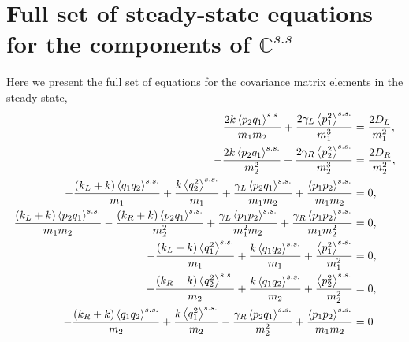 
\chapter{Full set of steady-state equations for the components of $\mathbb{C}^{s.s}$}
\label{Appendix:SteadyStateEquations}

Here we present the full set of equations for the covariance matrix elements in the steady state,
%
\begin{equation}
  \begin{split}
    \frac{2 k \expval{ p_2 q_1}^{s.s.} }{m_1 m_2}+\frac{2 \gamma _L \expval{ p_1^2}^{s.s.} }{m_1^3}&=\frac{2 D_L}{m_1^2},
    \\
    -\frac{2 k \expval{ p_2 q_1}^{s.s.} }{m_2^2}+\frac{2 \gamma _R \expval{ p_2^2}^{s.s.} }{m_2^3}&=\frac{2 D_R}{m_2^2},
    \\
    -\frac{\left(k_L+k\right) \expval{ q_1 q_2}^{s.s.} }{m_1}+\frac{k \expval{ q_2^2}^{s.s.} }{m_1}+\frac{\gamma _L \expval{ p_2 q_1}^{s.s.} }{m_1 m_2}+\frac{\expval{ p_1 p_2}^{s.s.} }{m_1 m_2}&=0,
    \\
    \frac{\left(k_L+k\right) \expval{ p_2 q_1}^{s.s.} }{m_1 m_2}-\frac{\left(k_R+k\right) \expval{ p_2 q_1}^{s.s.} }{m_2^2}+\frac{\gamma _L \expval{ p_1 p_2}^{s.s.} }{m_1^2 m_2}+\frac{\gamma _R \expval{ p_1 p_2}^{s.s.} }{m_1 m_2^2}&=0,
    \\
    -\frac{\left(k_L+k\right) \expval{ q_1^2}^{s.s.} }{m_1}+\frac{k \expval{ q_1 q_2}^{s.s.} }{m_1}+\frac{\expval{ p_1^2}^{s.s.} }{m_1^2}&=0,
    \\
    -\frac{\left(k_R+k\right) \expval{ q_2^2}^{s.s.} }{m_2}+\frac{k \expval{ q_1 q_2}^{s.s.} }{m_2}+\frac{\expval{ p_2^2}^{s.s.} }{m_2^2}&=0,
    \\
    -\frac{\left(k_R+k\right) \expval{ q_1 q_2}^{s.s.} }{m_2}+\frac{k \expval{ q_1^2}^{s.s.} }{m_2}-\frac{\gamma _R \expval{ p_2 q_1}^{s.s.} }{m_2^2}+\frac{\expval{ p_1 p_2}^{s.s.} }{m_1 m_2}&=0
  \end{split}
  \label{eq:SteadyStateEquationsModelB_Explicite}
\end{equation}
